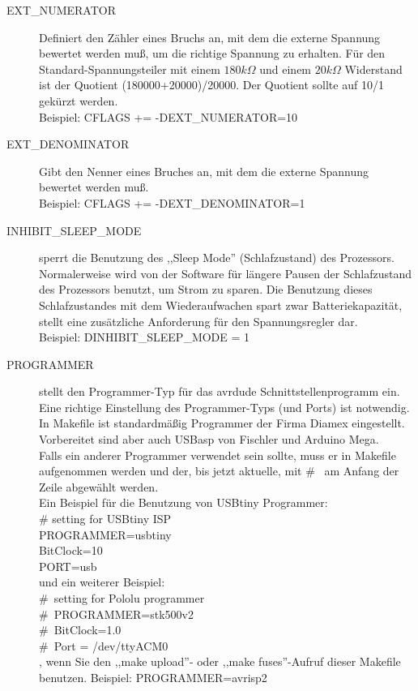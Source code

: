 \begin{description}
 \item[EXT\_NUMERATOR] Definiert den Zähler eines Bruchs an, mit dem die externe Spannung bewertet werden muß,
um die richtige Spannung zu erhalten. Für den Standard-Spannungsteiler mit einem \(180 k\Omega\) und 
einem \(20 k\Omega\) Widerstand ist der Quotient (180000+20000)/20000.
Der Quotient sollte auf 10/1 gekürzt werden.\\
Beispiel: CFLAGS += -DEXT\_NUMERATOR=10

 \item[EXT\_DENOMINATOR] Gibt den Nenner eines Bruches an, mit dem die externe Spannung bewertet werden muß.\\
Beispiel: CFLAGS += -DEXT\_DENOMINATOR=1

  \item[INHIBIT\_SLEEP\_MODE] sperrt die Benutzung des ,,Sleep Mode'' (Schlafzustand) des Prozessors.
Normalerweise wird von der Software für längere Pausen der Schlafzustand des Prozessors benutzt, um Strom zu sparen.
Die Benutzung dieses Schlafzustandes mit dem Wiederaufwachen spart zwar Batteriekapazität, 
stellt eine zusätzliche Anforderung für den Spannungsregler dar.\\
Beispiel: DINHIBIT\_SLEEP\_MODE = 1

\label{sec:config-Prog}
  \item[PROGRAMMER] stellt den Programmer-Typ für das avrdude Schnittstellenprogramm ein.\\
Eine richtige Einstellung des Programmer-Typs (und Ports) ist notwendig.\\
In Makefile ist standardmäßig Programmer der Firma Diamex eingestellt.\\
Vorbereitet sind aber auch USBasp von Fischler und Arduino Mega.\\
Falls ein anderer Programmer verwendet sein sollte, muss er in Makefile aufgenommen werden und der,
bis jetzt aktuelle, mit \#~ am Anfang der Zeile abgewählt werden.\\
Ein Beispiel für die Benutzung von USBtiny Programmer:\\
\# setting for USBtiny ISP\\
PROGRAMMER=usbtiny\\
BitClock=10\\
PORT=usb\\
und ein weiterer Beispiel:\\
\#~setting for Pololu programmer\\
\#~PROGRAMMER=stk500v2\\
\#~BitClock=1.0\\
\#~Port = /dev/ttyACM0\\
, wenn Sie den ,,make upload''- oder
,,make fuses''-Aufruf dieser Makefile benutzen.
Beispiel: PROGRAMMER=avrisp2


\end{description}
